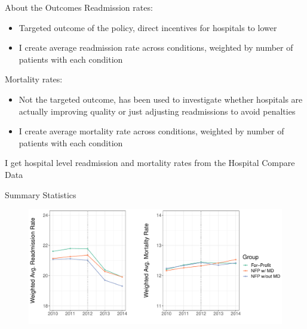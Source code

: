 \documentclass[notes,11pt, aspectratio=169]{beamer}
\begin{document}
\begin{frame}{About the Outcomes}
    Readmission rates:
    \begin{itemize}
        \item Targeted outcome of the policy, direct incentives for hospitals to lower 
        \item I create average readmission rate across conditions, weighted by number of patients with each condition
    \end{itemize}

    \vspace{5mm}

    Mortality rates:
    \begin{itemize}
        \item Not the targeted outcome, has been used to investigate whether hospitals are actually improving quality or just adjusting readmissions to avoid penalties
        \item I create average mortality rate across conditions, weighted by number of patients with each condition
    \end{itemize}

    \vspace{10mm}

    I get hospital level readmission and mortality rates from the Hospital Compare Data
\end{frame}

\begin{frame}{Summary Statistics}\label{sumstatsgraph}
    \begin{figure}
        \centering
        \includegraphics[width=\linewidth]{Objects/weighted_read_mort_graph.pdf}
    \end{figure}

    \hyperlink{sumstats}{}
\end{frame}
\end{document}
